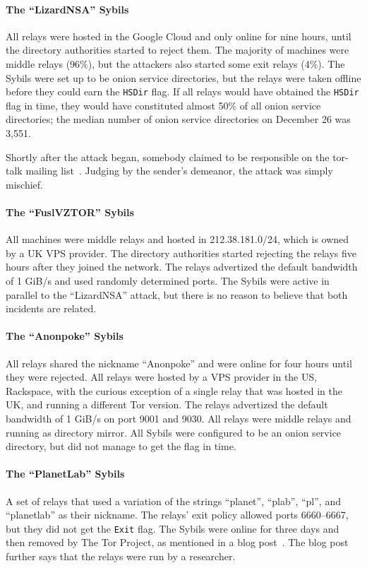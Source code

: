 \paragraph{The ``LizardNSA'' Sybils}
All relays were hosted in the Google Cloud and only online for nine hours, until
the directory authorities started to reject them.  The majority of machines were
middle relays (96\%), but the attackers also started some exit relays (4\%).
The Sybils were set up to be onion service directories, but the relays were
taken offline before they could earn the \texttt{HSDir} flag.  If all relays
would have obtained the \texttt{HSDir} flag in time, they would have constituted
almost 50\% of all onion service directories; the median number of onion service
directories on December 26 was 3,551.

Shortly after the attack began, somebody claimed to be responsible on the
tor-talk mailing list~\cite{lizards}.  Judging by the sender's demeanor, the
attack was simply mischief.

\paragraph{The ``FuslVZTOR'' Sybils}
All machines were middle relays and hosted in 212.38.181.0/24, which is owned by
a UK VPS provider.  The directory authorities started rejecting the relays five
hours after they joined the network.  The relays advertized the default bandwidth
of 1 GiB/s and used randomly determined ports.  The Sybils were active in
parallel to the ``LizardNSA'' attack, but there is no reason to believe that
both incidents are related.

\paragraph{The ``Anonpoke'' Sybils}
All relays shared the nickname ``Anonpoke'' and were online for four hours until
they were rejected.  All relays were hosted by a VPS provider in the US,
Rackspace, with the curious exception of a single relay that was hosted in the
UK, and running a different Tor version.  The relays advertized the default
bandwidth of 1 GiB/s on port 9001 and 9030.  All relays were middle relays and
running as directory mirror.  All Sybils were configured to be an onion service
directory, but did not manage to get the flag in time.

\paragraph{The ``PlanetLab'' Sybils}
A set of relays that used a variation of the strings ``planet'', ``plab'',
``pl'', and ``planetlab'' as their nickname.  The relays' exit policy allowed
ports 6660--6667, but they did not get the \texttt{Exit} flag.  The Sybils were
online for three days and then removed by The Tor Project, as mentioned in a
blog post~\cite{progressreport}.  The blog post further says that the relays
were run by a researcher.


